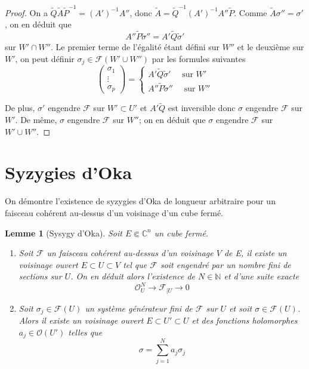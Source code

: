 \documentclass{article}
\newtheorem{lemme}[theoreme]{Lemme}
\theoremstyle{definition}
\theoremstyle{remark}
\begin{document}
\begin{proof}
On a $\tilde{Q}\tilde{A}\tilde{P}^{-1} = (A')^{-1}A''$, donc $\tilde{A} = \tilde{Q}^{-1}(A')^{-1}A''\tilde{P}$. Comme $\tilde{A}\sigma'' = \sigma'$, on en déduit que $$A''\tilde{P}\tilde{\sigma}''=A'\tilde{Q}\tilde{\sigma}'$$ sur $W' \cap W''$. Le premier terme de l'égalité étant défini sur $W''$ et le deuxième sur $W'$, on peut définir $\sigma_j \in \mathcal{F}(W'\cup W'')$ par les formules suivantes
\begin{equation*}
\begin{pmatrix}
   \sigma_1 \\ \vdots \\ \sigma_p
\end{pmatrix} = \left\{
\begin{array}{l}
  A'\tilde{Q}\tilde{\sigma}' \quad\text{ sur } W'\\
  A''\tilde{P}\tilde{\sigma}'' \quad\text{ sur } W''
\end{array}
\right.
\end{equation*}

De plus, $\sigma'$ engendre $\mathcal{F}$ sur $W' \subset U'$ et $A'\tilde{Q}$ est inversible donc $\sigma$ engendre $\mathcal{F}$ sur $W'$. De même, $\sigma$ engendre $\mathcal{F}$ sur $W''$; on en déduit que $\sigma$ engendre $\mathcal{F}$ sur $W'\cup W''$.
\end{proof}

\section{Syzygies d'Oka}

On démontre l'existence de syzygies d'Oka de longueur arbitraire pour un faisceau cohérent au-dessus d'un voisinage d'un cube fermé.

\begin{lemme}[Sysygy d'Oka]
Soit $E \Subset \mathbb{C}^n$ un cube fermé.
\begin{enumerate}
\item Soit $\mathcal{F}$ un faisceau cohérent au-dessus d'un voisinage $V$ de E, il existe un voisinage ouvert $E \subset U \subset V$ tel que $\mathcal{F}$ soit engendré par un nombre fini de sections sur $U$. On en déduit alors l'existence de $N \in \mathbb{N}$ et d'une suite exacte $$\mathcal{O}^N_U \to \mathcal{F}_{|U} \to 0$$
\item Soit $\sigma_j \in \mathcal{F}(U)$ un système générateur fini de $\mathcal{F}$ sur $U$ et  soit $\sigma \in \mathcal{F}(U)$. Alors il existe un voisinage ouvert $E \subset U' \subset U$ et des fonctions holomorphes $a_j \in \mathcal{O}(U')$ telles que $$\sigma = \sum_{j=1}^N a_j\sigma_j$$
\end{enumerate}
\end{lemme}
\end{document}
